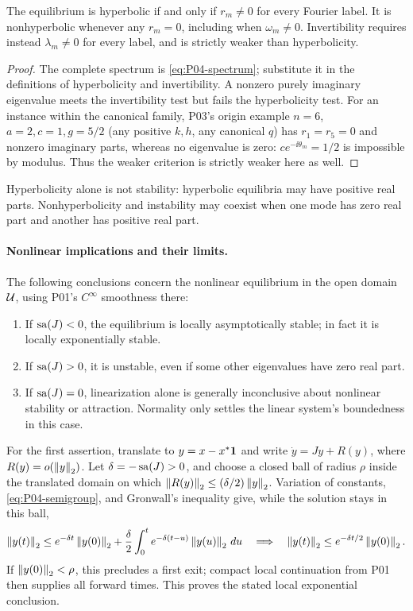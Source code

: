 \begin{proposition}[Hyperbolicity]
\label{prop:P04-hyperbolicity}
The equilibrium is hyperbolic if and only if $r_m\ne0$ for every
Fourier label. It is nonhyperbolic whenever any $r_m=0$, including
when $\omega_m\ne0$. Invertibility requires instead
$\lambda_m\ne0$ for every label, and is strictly weaker than
hyperbolicity.
\end{proposition}
\begin{proof}
The complete spectrum is \eqref{eq:P04-spectrum}; substitute it in
the definitions of hyperbolicity and invertibility. A nonzero purely
imaginary eigenvalue meets the invertibility test but fails the
hyperbolicity test. For an instance within the canonical family,
P03's origin example $n=6$, $a=2,c=1,g=5/2$ (any positive $k,h$,
any canonical $q$) has $r_1=r_5=0$ and nonzero imaginary parts,
whereas no eigenvalue is zero: $ce^{-\ii\theta_m}=1/2$ is impossible
by modulus. Thus the weaker criterion is strictly weaker here as well.
\end{proof}
Hyperbolicity alone is not stability: hyperbolic equilibria may have
positive real parts. Nonhyperbolicity and instability may coexist
when one mode has zero real part and another has positive real part.

\paragraph{Nonlinear implications and their limits.}
The following conclusions concern the nonlinear equilibrium in the
open domain $\mathcal{U}$, using P01's $C^\infty$ smoothness there:
\begin{enumerate}[label=(\roman*),leftmargin=*]
\item If $\operatorname{sa}(J)<0$, the equilibrium is locally asymptotically stable;
in fact it is locally exponentially stable.
\item If $\operatorname{sa}(J)>0$, it is unstable, even if some other eigenvalues
have zero real part.
\item If $\operatorname{sa}(J)=0$, linearization alone is generally inconclusive
about nonlinear stability or attraction. Normality only settles the
linear system's boundedness in this case.
\end{enumerate}
For the first assertion, translate to $y=x-x^*\mathbf{1}$ and write
$\dot y=Jy+R(y)$, where $R(y)=o(\left\lVert y\right\rVert_2)$.
Let $\delta=-\operatorname{sa}(J)>0$, and choose a closed ball of radius $\rho$
inside the translated domain on which
$\left\lVert R(y)\right\rVert_2\le(\delta/2)\left\lVert y\right\rVert_2$.
Variation of constants, \eqref{eq:P04-semigroup}, and Gronwall's
inequality give, while the solution stays in this ball,
\[
 \left\lVert y(t)\right\rVert_2\le e^{-\delta t}\left\lVert y(0)\right\rVert_2
   +\frac\delta2\int_0^t e^{-\delta(t-u)}\left\lVert y(u)\right\rVert_2\,du
 \quad\Longrightarrow\quad
 \left\lVert y(t)\right\rVert_2\le e^{-\delta t/2}\left\lVert y(0)\right\rVert_2.
\]
If $\left\lVert y(0)\right\rVert_2<\rho$, this precludes a first exit; compact
local continuation from P01 then supplies all forward times.
This proves the stated local exponential conclusion.

